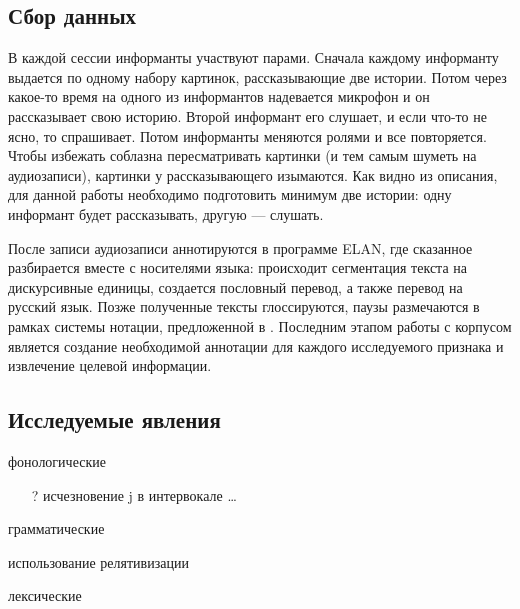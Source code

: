 \subsection{Сбор данных}
\noindent В каждой сессии информанты участвуют парами. Сначала каждому информанту выдается по одному набору картинок, рассказывающие две истории. Потом через какое-то время на одного из информантов надевается микрофон и он рассказывает свою историю. Второй информант его слушает, и если что-то не ясно, то спрашивает. Потом информанты меняются ролями и все повторяется. Чтобы избежать соблазна пересматривать картинки (и тем самым шуметь на аудиозаписи), картинки у рассказывающего изымаются. Как видно из описания, для данной работы необходимо подготовить минимум две истории: одну информант будет рассказывать, другую --- слушать.
\par После записи аудиозаписи аннотируются в программе ELAN, где сказанное разбирается вместе с носителями языка: происходит сегментация текста на дискурсивные единицы, создается пословный перевод, а также перевод на русский язык. Позже полученные тексты глоссируются, паузы размечаются в рамках системы нотации, предложенной в \citep{kibrik14}. Последним этапом работы с корпусом является создание необходимой аннотации для каждого исследуемого признака и извлечение целевой информации.
\pagebreak
\subsection{Исследуемые явления}
\begin{itemize}
\mytem фонологические
\begin{itemize}
\mytem скорость речи
\mytem длительность сегментов и их составляющих
\begin{itemize}
\mytem длительность гласных
\mytem VOT стопов и аффрикат
\mytem длительность фрикативных
\end{itemize}
\mytem форманты гласных
\mytem спектральная характеристика фрикативных
\mytem чередование ɐ $\sim$ a
\item[?] исчезновение j в интервокале
\mytem \dots
\end{itemize}
\mytem грамматические
\begin{itemize}
\mytem использование релятивизации
\end{itemize}
\mytem лексические
\end{itemize}
